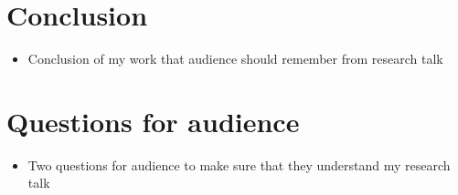 \documentclass[11pt]{article}       %
\newenvironment{slide}[1]        {\section{#1} \begin{itemize}}%
                                 {\end{itemize}}
\begin{document}
\begin{slide}{Conclusion}
\item Conclusion of my work that audience should remember from research talk
\end{slide}

\begin{slide}{Questions for audience}
\item Two questions for audience to make sure that they understand my research talk
\end{slide}

\end{document}
